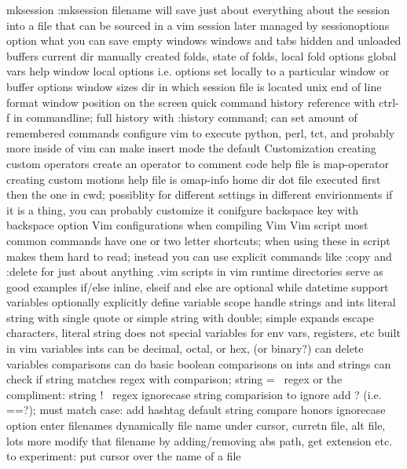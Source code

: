 \documentclass[12pt]{book}
\begin{document}
{{    mksession
      :mksession filename will save just about everything about the session into a file that can be sourced in a vim session later
      managed by sessionoptions option
      what you can save
        empty windows
        windows and tabs
        hidden and unloaded buffers
        current dir
        manually created folds, state of folds, local fold options
        global vars
        help window
        local options i.e. options set locally to a particular window or buffer
        options
        window sizes
        dir in which session file is located
        unix end of line format
        window position on the screen
  quick command history reference with ctrl-f in commandline; full history with :history command; can set amount of remembered commands
  configure vim to execute python, perl, tct, and probably more inside of vim
  can make insert mode the default
Customization
  creating custom operators
    create an operator to comment code
    help file is map-operator
  creating custom motions
    help file is omap-info
  home dir dot file executed first then the one in cwd; possiblity for different settings in different envirionments
  if it is a thing, you can probably customize it
  conifgure backspace key with backspace option
  Vim configurations when compiling Vim
  Vim script
    most common commands have one or two letter shortcuts; when using these in script makes them hard to read; instead you can use explicit commands like :copy and :delete for just about anything
    .vim scripts in vim runtime directories serve as good examples
    if/else
      inline, elseif and else are optional
    while
    datetime support
    variables
      optionally explicitly define variable scope
      handle strings and ints
      literal string with single quote or simple string with double; simple expands escape characters, literal string does not
      special variables for env vars, registers, etc
      built in vim variables
      ints can be decimal, octal, or hex, (or binary?)
      can delete variables
    comparisons
      can do basic boolean comparisons on ints and strings
      can check if string matches regex with comparison; string =~ regex or the compliment: string !~ regex
      ignorecase string comparision
        to ignore add ? (i.e. ==?); must match case: add hashtag
        default string compare honors ignorecase option
    enter filenames dynamically
      file name under cursor, curretn file, alt file, lots more
      modify that filename by adding/removing abs path, get extension etc.
      to experiment:
        put cursor over the name of a file
}}
\end{document}
